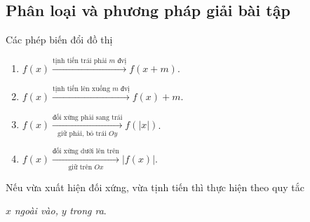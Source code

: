 \subsection{Phân loại và phương pháp giải bài tập}
\begin{dang}{Các phép biến đổi đồ thị}
\begin{enumerate}
	\item $f(x) \xrightarrow{{\text{tịnh tiến trái phải }m \text{ đvị}}} f(x+m)$.
	\item $f(x) \xrightarrow{{\text{tịnh tiến lên xuống }m \text{ đvị}}} f(x)+m$.
	\item $f(x) \xrightarrow[{\text{giữ phải, bỏ trái } Oy}]{{\text{đối xứng phải sang trái}}} f(|x|)$.
	\item $f(x) \xrightarrow[{\text{giữ trên }Ox}]{{\text{đối xứng dưới lên trên}}} |f(x)|$.
\end{enumerate}
\end{dang}
\begin{note}
Nếu vừa xuất hiện đối xứng, vừa tịnh tiến thì thực hiện theo quy tắc 
\begin{center}
	 $x$ \textit{ngoài vào,} $y$ \textit{trong ra}.
\end{center}
\end{note}

